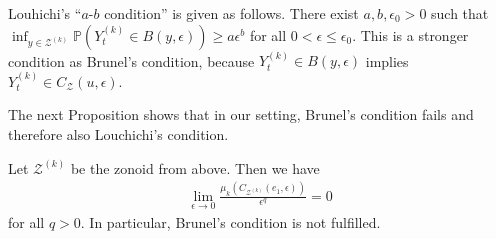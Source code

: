 Louhichi's \enquote{$a$-$b$ condition} is given as follows. There exist $a,b,\epsilon_0>0$ such that $\inf_{y\in\mathcal{Z}^{(k)}}\mathbb{P}(Y_t^{(k)}\in B(y,\epsilon))\ge a\epsilon^b$ for all $0<\epsilon\le\epsilon_0$. This is a stronger condition as Brunel's condition, because $Y_t^{(k)}\in B(y,\epsilon)$ implies $Y_t^{(k)}\in C_{\mathcal{Z}}(u,\epsilon)$.

The next Proposition shows that in our setting, Brunel's condition fails and therefore also Louchichi's condition.

\begin{Prop}\label{prop:sliding_window_fails_brunel}
    Let $\mathcal{Z}^{(k)}$ be the zonoid from above. Then we have
    \begin{align*}
        \lim_{\epsilon\to0}\frac{\mu_k(C_{\mathcal{Z}^{(k)}}(e_1,\epsilon))}{\epsilon^{q}}=0
    \end{align*}
    for all $q>0$. In particular, Brunel's condition is not fulfilled.
\end{Prop}

